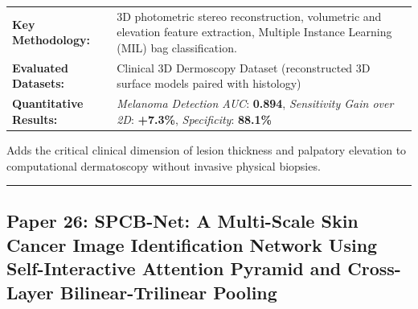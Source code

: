 \documentclass[10pt,a4paper]{article}
\begin{document}
\vspace{4pt}
\begin{tabularx}{\linewidth}{p{3.2cm}X}
\toprule
\textbf{Key Methodology:} & 3D photometric stereo reconstruction, volumetric and elevation feature extraction, Multiple Instance Learning (MIL) bag classification. \\
\textbf{Evaluated Datasets:} & Clinical 3D Dermoscopy Dataset (reconstructed 3D surface models paired with histology) \\
\textbf{Quantitative Results:} & \textit{Melanoma Detection AUC}: \textbf{0.894}, \textit{Sensitivity Gain over 2D}: \textbf{+7.3\%}, \textit{Specificity}: \textbf{88.1\%} \\
\bottomrule
\end{tabularx}
\vspace{4pt}
\begin{tcolorbox}[utilitybox,title=Clinical Utility and Real-World Impact]
Adds the critical clinical dimension of lesion thickness and palpatory elevation to computational dermatoscopy without invasive physical biopsies.
\end{tcolorbox}
\vspace{12pt}
\hrule
\vspace{12pt}
\subsection*{Paper 26: SPCB-Net: A Multi-Scale Skin Cancer Image Identification Network Using Self-Interactive Attention Pyramid and Cross-Layer Bilinear-Trilinear Pooling}
\end{document}
